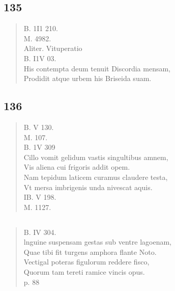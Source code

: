 \documentclass[11pt, a4paper]{report}
\begin{document}
            \subsection*{135}
      \begin{verse}
      B. 1I1 210. \\ M. 4982. \\ Aliter. Vituperatio \\ B. I1V 03. \\ His contempta deum tenuit Discordia mensam, \\ Prodidit atque urbem his Briseida suam. \\ 
      \end{verse}
  
            \subsection*{136}
      \begin{verse}
      B. V 130. \\ M. 107. \\ B. 1V 309 \\ Cillo vomit gelidum vastis singultibus amnem, \\ Vis aliena cui frigoris addit opem. \\ Nam tepidum laticem curamus claudere testa, \\ Vt mersa imbrigenis unda nivescat aquis. \\ IB. V 198. \\ M. 1127. \\ 
      \end{verse}
  
            \subsection*{}
      \begin{verse}
      B. IV 304. \\ lnguine suspensam gestas  \lbrack sub ventre \rbrack  lagoenam, \\ Quae tibi fit turgens amphora flante Noto. \\ Vectigal poteras figulorum reddere fisco, \\ Quorum tam tereti ramice vincis opus. \\ p. 88 \\ 
      \end{verse}
  
\end{document}
